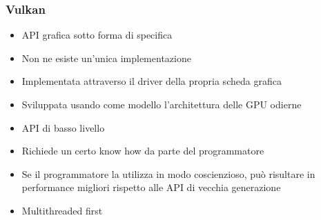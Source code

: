 \begin{frame}
\frametitle{Vulkan}

\begin{itemize}
\item API grafica sotto forma di specifica
\item Non ne esiste un'unica implementazione
\item Implementata attraverso il driver della propria scheda grafica
\item Sviluppata usando come modello l'architettura delle GPU odierne
\item API di basso livello
\item Richiede un certo know how da parte del programmatore
\item Se il programmatore la utilizza in modo coscienzioso, può risultare in performance migliori rispetto alle API di vecchia generazione
\item Multithreaded first
\end{itemize}

\end{frame}
